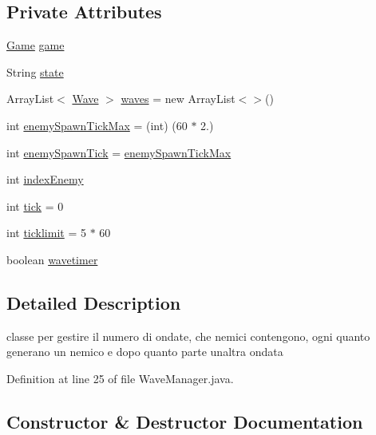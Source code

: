 \subsection*{Private Attributes}
\begin{DoxyCompactItemize}
\item 
\hyperlink{classprogetto_1_1_game}{Game} \hyperlink{classmanagers_1_1_wave_manager_ac6a5ed6191fcf3a5bf0445921feb4f48}{game}
\item 
String \hyperlink{classmanagers_1_1_wave_manager_a91ac952876f776b3fbbc8519e093fdbf}{state}
\item 
Array\+List$<$ \hyperlink{classevents_1_1_wave}{Wave} $>$ \hyperlink{classmanagers_1_1_wave_manager_a8ef0454bb56915f114dd34cece9ef71d}{waves} = new Array\+List$<$$>$()
\item 
int \hyperlink{classmanagers_1_1_wave_manager_a0e8822976d3f16d40f2b47df20a8355e}{enemy\+Spawn\+Tick\+Max} = (int) (60 $\ast$ 2.)
\item 
int \hyperlink{classmanagers_1_1_wave_manager_acaa0a3d510326342c5cc61393bfc61ad}{enemy\+Spawn\+Tick} = \hyperlink{classmanagers_1_1_wave_manager_a0e8822976d3f16d40f2b47df20a8355e}{enemy\+Spawn\+Tick\+Max}
\item 
int \hyperlink{classmanagers_1_1_wave_manager_ae1548354954c26806f4a9ff6857b3ab9}{index\+Enemy}
\item 
int \hyperlink{classmanagers_1_1_wave_manager_ad4e0bbc0cc0ffb91120206fb4de60261}{tick} = 0
\item 
int \hyperlink{classmanagers_1_1_wave_manager_a048afdace70897895af484b95492aea8}{ticklimit} = 5 $\ast$ 60
\item 
boolean \hyperlink{classmanagers_1_1_wave_manager_a2fa0a649e48706285ad6c2b814f4855b}{wavetimer}
\end{DoxyCompactItemize}


\subsection{Detailed Description}
classe per gestire il numero di ondate, che nemici contengono, ogni quanto generano un nemico e dopo quanto parte un\textquotesingle{}altra ondata 

Definition at line 25 of file Wave\+Manager.\+java.



\subsection{Constructor \& Destructor Documentation}
\mbox{\label{classmanagers_1_1_wave_manager_a4f9054a370c040f84d220fce947314f2}} 
